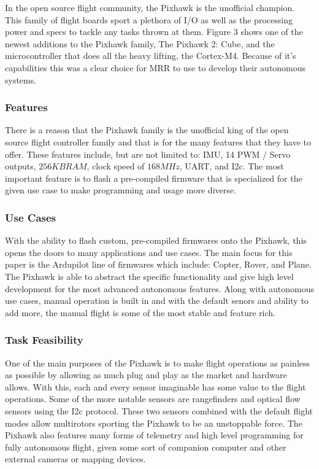\documentclass[conference,12pt, ]{IEEEtran}
\begin{document}
In the open source flight community, the Pixhawk is the unofficial champion. This family of flight boards sport a plethora of I/O as well as the processing power and specs to tackle any tasks thrown at them. Figure 3 shows one of the newest additions to the Pixhawk family, The Pixhawk 2: Cube, and the microcontroller that does all the heavy lifting, the Cortex-M4. Because of it's capabilities this was a clear choice for MRR to use to develop their autonomous systems. 

\subsubsection{Features}
There is a reason that the Pixhawk family is the unofficial king of the open source flight controller family and that is for the many features that they have to offer. These features include, but are not limited to: IMU, 14 PWM / Servo outputs, $256 KB RAM$, clock speed of $168 MHz$, UART, and I2c. The most important feature is to flash a pre-compiled firmware that is specialized for the given use case to make programming and usage more diverse. 
\subsubsection{Use Cases}
With the ability to flash custom, pre-compiled firmwares onto the Pixhawk, this opens the doors to many applications and use cases. The main focus for this paper is the Ardupilot line of firmwares which include: Copter, Rover, and Plane. The Pixhawk is able to abstract the specific functionality and give high level development for the most advanced autonomous features. Along with autonomous use cases, manual operation is built in and with the default senors and ability to add more, the manual flight is some of the most stable and feature rich. 
\subsubsection{Task Feasibility}
One of the main purposes of the Pixhawk is to make flight operations as painless as possible by allowing as much plug and play as the market and hardware allows. With this, each and every sensor imaginable has some value to the flight operations. Some of the more notable sensors are rangefinders and optical flow sensors using the I2c protocol. These two sensors combined with the default flight modes allow multirotors sporting the Pixhawk to be an unstoppable force. The Pixhawk also features many forms of telemetry and high level programming for fully autonomous flight, given some sort of companion computer and other external cameras or mapping devices.
\end{document}
